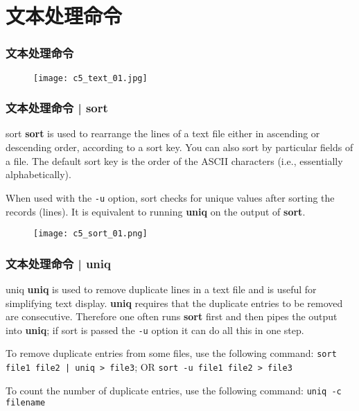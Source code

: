 \section{文本处理命令}
\begin{frame}
  \frametitle{\alert{文本处理命令}}
  \begin{figure}
    \centering
    \texttt{[image: c5\_text\_01.jpg]}
  \end{figure}
\end{frame}

\begin{frame}[fragile]
  \frametitle{文本处理命令 | sort}
  \begin{block}{sort}
    \textbf{sort} is used to rearrange the lines of a text file either in ascending or descending order, according to a sort key. You can also sort by particular fields of a file. The default sort key is the order of the ASCII characters (i.e., essentially alphabetically).

    When used with the \verb|-u| option, sort checks for unique values after sorting the records (lines). It is equivalent to running \textbf{uniq} on the output of \textbf{sort}.
  \end{block}
  \pause
  \begin{figure}
    \centering
    \texttt{[image: c5\_sort\_01.png]}
  \end{figure}
\end{frame}

\begin{frame}[fragile]
  \frametitle{文本处理命令 | uniq}
  \begin{block}{uniq}
    \textbf{uniq} is used to remove duplicate lines in a text file and is useful for simplifying text display. \textbf{uniq} requires that the duplicate entries to be removed are consecutive. Therefore one often runs \textbf{sort} first and then pipes the output into \textbf{uniq}; if sort is passed the \verb|-u| option it can do all this in one step. 

    To remove duplicate entries from some files, use the following command: \verb=sort file1 file2 | uniq > file3=; OR \verb|sort -u file1 file2 > file3|

    To count the number of duplicate entries, use the following command: \verb|uniq -c filename|
  \end{block}
\end{frame}

